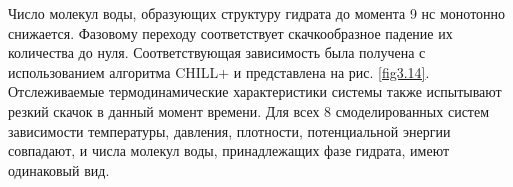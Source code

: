 Число молекул воды, образующих структуру гидрата до момента 9 нс монотонно снижается. Фазовому переходу соответствует скачкообразное падение их количества до нуля. Соответствующая зависимость была получена с использованием алгоритма CHILL+ и представлена на рис. \ref{fig3.14}. Отслеживаемые термодинамические характеристики системы также испытывают резкий скачок в данный момент времени. Для всех 8 смоделированных систем зависимости температуры, давления, плотности, потенциальной энергии совпадают, и числа молекул воды, принадлежащих фазе гидрата, имеют одинаковый вид.
